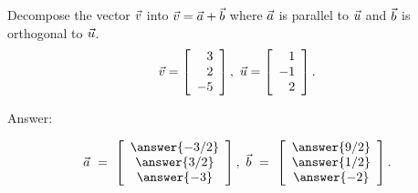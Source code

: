 \documentclass{ximera}
\begin{document}
  \begin{problem}
    Decompose the vector $\vect{v}$ into $\vect{v}=\vect{a}+\vect{b}$
    where $\vect{a}$ is parallel to $\vect{u}$ and $\vect{b}$ is
    orthogonal to $\vect{u}$.
    \begin{equation*}
      \vect{v} = \startmat{r} 3\\2\\-5 \stopmat,\quad
      \vect{u} = \startmat{r} 1\\-1\\2 \stopmat.
    \end{equation*}
  
    Answer:

      \begin{equation*}
        \vect{a} ~=~ \startmat{c} \answer{-3/2}\\\answer{3/2}\\\answer{-3} \stopmat,\quad
        \vect{b} ~=~ \startmat{c} \answer{9/2}\\\answer{1/2}\\\answer{-2} \stopmat.
      \end{equation*}

  \end{problem}
\end{document}
